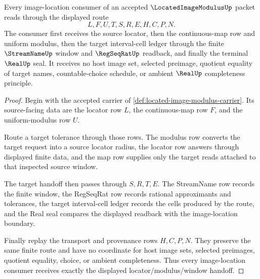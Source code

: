 \begin{theorem}
\label{thm:located-image-modulus-finite-window-handoff}
Every image-location consumer of an accepted $\LocatedImageModulusUp$ packet reads through the displayed route
$$
L,F,U,T,S,R,E,H,C,P,N .
$$
The consumer first receives the source locator, then the continuous-map row and uniform modulus, then the target interval-cell ledger through the finite $\StreamNameUp$ window and $\RegSeqRatUp$ readback, and finally the terminal $\RealUp$ seal. It receives no host image set, selected preimage, quotient equality of target names, countable-choice schedule, or ambient $\RealUp$ completeness principle.
\end{theorem}
\begin{proof}
Begin with the accepted carrier of \autoref{def:located-image-modulus-carrier}. Its source-facing data are the locator row $L$, the continuous-map row $F$, and the uniform-modulus row $U$.

Route a target tolerance through those rows. The modulus row converts the target request into a source locator radius, the locator row answers through displayed finite data, and the map row supplies only the target reads attached to that inspected source window.

The target handoff then passes through $S,R,T,E$. The StreamName row records the finite window, the RegSeqRat row records rational approximants and tolerances, the target interval-cell ledger records the cells produced by the route, and the Real seal compares the displayed readback with the image-location boundary.

Finally replay the transport and provenance rows $H,C,P,N$. They preserve the same finite route and have no coordinate for host image sets, selected preimages, quotient equality, choice, or ambient completeness. Thus every image-location consumer receives exactly the displayed locator/modulus/window handoff.
\end{proof}


